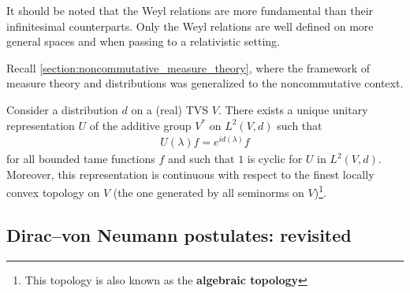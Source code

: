 
    \begin{remark}
        It should be noted that the Weyl relations are more fundamental than their infinitesimal counterparts. Only the Weyl relations are well defined on more general spaces and when passing to a relativistic setting.
    \end{remark}

    Recall \cref{section:noncommutative_measure_theory}, where the framework of measure theory and distributions was generalized to the noncommutative context.
    \begin{property}
        Consider a distribution $d$ on a (real) TVS $V$. There exists a unique unitary representation $U$ of the additive group $V^*$ on $L^2(V,d)$ such that
        \begin{gather}
            U(\lambda)f = e^{id(\lambda)}f
        \end{gather}
        for all bounded tame functions $f$ and such that $1$ is cyclic for $U$ in $L^2(V,d)$. Moreover, this representation is continuous with respect to the finest locally convex topology on $V$ (the one generated by all seminorms on $V$)\footnote{This topology is also known as the \textbf{algebraic topology}}. 
    \end{property}


\subsection{Dirac--von Neumann postulates: revisited}

